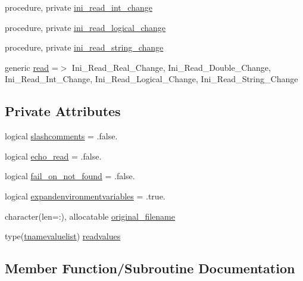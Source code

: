 \begin{DoxyCompactItemize}
procedure, private \mbox{\hyperlink{structiniobjects_1_1tinifile_a2cd7342bceba9482a7eaa25a0a822c23}{ini\+\_\+read\+\_\+int\+\_\+change}}
\item 
procedure, private \mbox{\hyperlink{structiniobjects_1_1tinifile_a5f578e34fa244044d1e3d091a1b93fcf}{ini\+\_\+read\+\_\+logical\+\_\+change}}
\item 
procedure, private \mbox{\hyperlink{structiniobjects_1_1tinifile_a54074bfd51751518c277f26be6b3a740}{ini\+\_\+read\+\_\+string\+\_\+change}}
\item 
generic \mbox{\hyperlink{structiniobjects_1_1tinifile_a1951ddeeb06721386528087a2645b80d}{read}} =$>$ Ini\+\_\+\+Read\+\_\+\+Real\+\_\+\+Change, Ini\+\_\+\+Read\+\_\+\+Double\+\_\+\+Change, Ini\+\_\+\+Read\+\_\+\+Int\+\_\+\+Change, Ini\+\_\+\+Read\+\_\+\+Logical\+\_\+\+Change, Ini\+\_\+\+Read\+\_\+\+String\+\_\+\+Change
\end{DoxyCompactItemize}
\subsection*{Private Attributes}
\begin{DoxyCompactItemize}
\item 
logical \mbox{\hyperlink{structiniobjects_1_1tinifile_ac47c098d1080f5c8a2ab7081872418f3}{slashcomments}} = .false.
\item 
logical \mbox{\hyperlink{structiniobjects_1_1tinifile_ab12efec9226277020351a3360f282c97}{echo\+\_\+read}} = .false.
\item 
logical \mbox{\hyperlink{structiniobjects_1_1tinifile_a5219457554976d5cbec640eaca8d65fb}{fail\+\_\+on\+\_\+not\+\_\+found}} = .false.
\item 
logical \mbox{\hyperlink{structiniobjects_1_1tinifile_a7cdab816acfe0599e229240a70d0eb3c}{expandenvironmentvariables}} = .true.
\item 
character(len=\+:), allocatable \mbox{\hyperlink{structiniobjects_1_1tinifile_ad910563e3d9db4183a112cd1e7edc94c}{original\+\_\+filename}}
\item 
type(\mbox{\hyperlink{structiniobjects_1_1tnamevaluelist}{tnamevaluelist}}) \mbox{\hyperlink{structiniobjects_1_1tinifile_aea6ace0ebb45700dda67ecec68ce5447}{readvalues}}
\end{DoxyCompactItemize}


\subsection{Member Function/\+Subroutine Documentation}
\mbox{\label{structiniobjects_1_1tinifile_a4f5667e2deeffdd66857bd082b866676}} 

